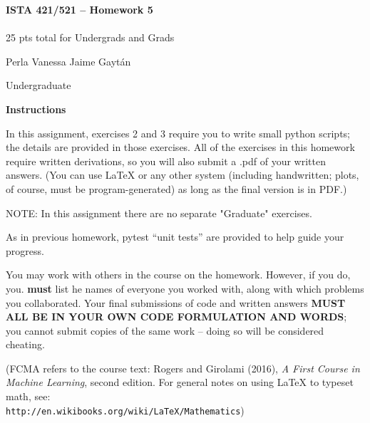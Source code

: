 \documentclass[10pt]{article}
\newcommand{\latex}{\LaTeX\xspace}
\begin{document}
\begin{center}
    {\Large {\bf ISTA 421/521 -- Homework 5}} \\
     \\
    25 pts total for Undergrads and Grads\\
    
\end{center}

\begin{flushright}
Perla Vanessa Jaime Gaytán %

Undergraduate  %
\end{flushright}

\vspace{1cm}
{\Large {\bf Instructions}}

In this assignment, exercises 2 and 3 require you to write small python scripts; the details are provided in those exercises.  All of the exercises in this homework require written derivations, so you will also submit a .pdf of your written answers.  (You can use \latex or any other system (including handwritten; plots, of course, must be program-generated) as long as the final version is in PDF.)

NOTE: In this assignment there are no separate "Graduate" exercises.

As in previous homework, pytest ``unit tests'' are provided to help guide your progress.

You may work with others in the course on the homework. However, if you do, you. {\bf must} list he names of everyone you worked with, along with which problems you collaborated. Your final submissions of code and written answers {\bf MUST ALL BE IN YOUR OWN CODE FORMULATION AND WORDS}; you cannot submit copies of the same work -- doing so will be considered cheating.

(FCMA refers to the course text: Rogers and Girolami (2016), {\em A First Course in Machine Learning}, second edition.  For general notes on using \latex to typeset math, see: \\{\tt http://en.wikibooks.org/wiki/LaTeX/Mathematics})
\vspace{.5cm}



\end{document}
